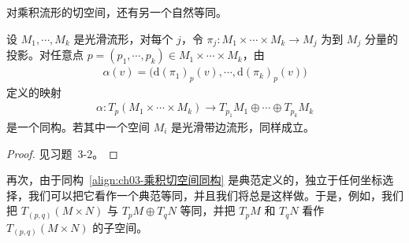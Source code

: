 \documentclass[../../main.tex]{subfiles}
\begin{document}
对乘积流形的切空间，还有另一个自然等同。

\begin{proposition}[乘积流形的切空间]\label{proposition:ch03-乘积流形切空间}
设 $M_{1},\cdots ,M_{k}$ 是光滑流形，对每个 $j$，令 $\pi_{j}:M_{1}\times\cdots\times M_{k}\to M_{j}$ 为到 $M_{j}$ 分量的投影。对任意点 $p=(p_{1},\cdots ,p_{k})\in M_{1}\times\cdots\times M_{k}$，由
\begin{align}\label{align:ch03-乘积切空间同构}
\alpha(v)=\bigl(\mathrm{d}(\pi_{1})_{p}(v),\cdots ,\mathrm{d}(\pi_{k})_{p}(v)\bigr)
\end{align}
定义的映射
\begin{align*}
\alpha:T_{p}(M_{1}\times\cdots\times M_{k})\to T_{p_{1}}M_{1}\oplus\cdots\oplus T_{p_{k}}M_{k}
\end{align*}
是一个同构。若其中一个空间 $M_{i}$ 是光滑带边流形，同样成立。
\end{proposition}

\begin{proof}
见习题~3-2。
\end{proof}

再次，由于同构~\eqref{align:ch03-乘积切空间同构} 是典范定义的，独立于任何坐标选择，我们可以把它看作一个典范等同，并且我们将总是这样做。于是，例如，我们把 $T_{(p,q)}(M\times N)$ 与 $T_{p}M\oplus T_{q}N$ 等同，并把 $T_{p}M$ 和 $T_{q}N$ 看作 $T_{(p,q)}(M\times N)$ 的子空间。
\end{document}
